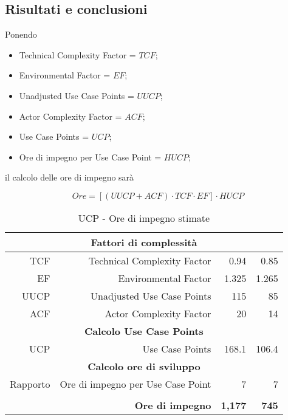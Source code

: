 \subsection{Risultati e conclusioni}

Ponendo

\begin{itemize}
	\item Technical Complexity Factor = $TCF$;
	\item Environmental Factor = $EF$;
	\item Unadjusted Use Case Points = $UUCP$;
	\item Actor Complexity Factor = $ACF$;
	\item Use Case Points = $UCP$;
	\item Ore di impegno per Use Case Point = $HUCP$;
\end{itemize}

il calcolo delle ore di impegno sarà

\[
Ore = [ (UUCP+ACF) \cdot TCF \cdot EF ] \cdot HUCP
\]

\begin{table}[H]
\begin{adjustwidth}{-4cm}{-4cm}
	\begin{center}
		\begin{tabular}{|r|r|r|r|}
			\hline
			\multicolumn{ 4}{|c|}{\textbf{Fattori di complessità}} \\ \hline
			TCF & Technical Complexity Factor & 0.94 & 0.85 \\ \hline
			EF & Environmental Factor & 1.325 & 1.265 \\ \hline
			UUCP & Unadjusted Use Case Points & 115 & 85 \\ \hline
			ACF & Actor Complexity Factor & 20 & 14 \\ \hline
			\multicolumn{ 4}{|c|}{\textbf{Calcolo Use Case Points}} \\ \hline
			UCP & Use Case Points & 168.1 & 106.4 \\ \hline
			\multicolumn{ 4}{|c|}{\textbf{Calcolo ore di sviluppo}} \\ \hline
			Rapporto & Ore di impegno per Use Case Point & 7 & 7 \\ \hline
			\multicolumn{ 4}{|c|}{} \\ \hline
			\multicolumn{ 2}{|r|}{\textbf{Ore di impegno}} & \textbf{ 1,177 } & \textbf{ 745 } \\ \hline
		\end{tabular}
	\end{center}
\caption{UCP - Ore di impegno stimate}
\label{tab:UCP-ore-di-impegno-stimate}
\end{adjustwidth}
\end{table}

